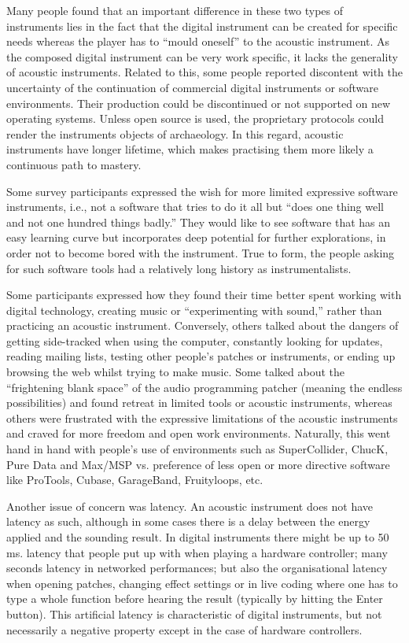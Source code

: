 Many people found that an important difference in these two types of instruments
lies in the fact that the digital instrument can be created for specific needs
whereas the player has to ``mould oneself'' to the acoustic instrument. As the
composed digital instrument can be very work specific, it lacks the generality of
acoustic instruments. Related to this, some people reported discontent with the
uncertainty of the continuation of commercial digital instruments or software
environments. Their production could be discontinued or not supported on new
operating systems. Unless open source is used, the proprietary protocols could
render the instruments objects of archaeology. In this regard, acoustic
instruments have longer lifetime, which makes practising them more likely a
continuous path to mastery.

Some survey participants expressed the wish for more limited expressive software
instruments, i.e., not a software that tries to do it all but ``does one thing
well and not one hundred things badly.'' They would like to see software that has
an easy learning curve but incorporates deep potential for further explorations,
in order not to become bored with the instrument. True to form, the people asking
for such software tools had a relatively long history as instrumentalists.

Some participants expressed how they found their time better spent working with
digital technology, creating music or ``experimenting with sound,'' rather than
practicing an acoustic instrument. Conversely, others talked about the dangers of
getting side-tracked when using the computer, constantly looking for updates,
reading mailing lists, testing other people's patches or instruments, or ending
up browsing the web whilst trying to make music. Some talked about the
``frightening blank space'' of the audio programming patcher (meaning the endless
possibilities) and found retreat in limited tools or acoustic instruments,
whereas others were frustrated with the expressive limitations of the acoustic
instruments and craved for more freedom and open work environments. Naturally,
this went hand in hand with people's use of environments such as SuperCollider,
ChucK, Pure Data and Max/MSP vs. preference of less open or more directive
software like ProTools, Cubase, GarageBand, Fruityloops, etc.

Another issue of concern was latency. An acoustic instrument does not have
latency as such, although in some cases there is a delay between the energy
applied and the sounding result. In digital instruments there might be up to 50
ms. latency that people put up with when playing a hardware controller; many
seconds latency in networked performances; but also the organisational latency
when opening patches, changing effect settings or in live coding where one has to
type a whole function before hearing the result (typically by hitting the Enter
button). This artificial latency is characteristic of digital instruments, but
not necessarily a negative property except in the case of hardware controllers.


